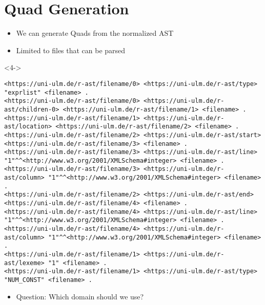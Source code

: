 \documentclass[aspectratio=169,usepdftitle=true,presentation,10pt]{beamer}
\begin{document}
\section[Quad Generation]{Quad Generation}
\begin{frame}[fragile]{\insertsection}
\begin{itemize}
   \item<2-> We can generate Quads from the normalized AST
   \item<3-> Limited to files that can be parsed
\end{itemize}
\bigskip
\begin{uncoverenv}<4->
\soldisablenumhl
\begin{verbatim}
<https://uni-ulm.de/r-ast/filename/0> <https://uni-ulm.de/r-ast/type> "exprlist" <filename> .
<https://uni-ulm.de/r-ast/filename/0> <https://uni-ulm.de/r-ast/children-0> <https://uni-ulm.de/r-ast/filename/1> <filename> .
<https://uni-ulm.de/r-ast/filename/1> <https://uni-ulm.de/r-ast/location> <https://uni-ulm.de/r-ast/filename/2> <filename> .
<https://uni-ulm.de/r-ast/filename/2> <https://uni-ulm.de/r-ast/start> <https://uni-ulm.de/r-ast/filename/3> <filename> .
<https://uni-ulm.de/r-ast/filename/3> <https://uni-ulm.de/r-ast/line> "1"^^<http://www.w3.org/2001/XMLSchema#integer> <filename> .
<https://uni-ulm.de/r-ast/filename/3> <https://uni-ulm.de/r-ast/column> "1"^^<http://www.w3.org/2001/XMLSchema#integer> <filename> .
<https://uni-ulm.de/r-ast/filename/2> <https://uni-ulm.de/r-ast/end> <https://uni-ulm.de/r-ast/filename/4> <filename> .
<https://uni-ulm.de/r-ast/filename/4> <https://uni-ulm.de/r-ast/line> "1"^^<http://www.w3.org/2001/XMLSchema#integer> <filename> .
<https://uni-ulm.de/r-ast/filename/4> <https://uni-ulm.de/r-ast/column> "1"^^<http://www.w3.org/2001/XMLSchema#integer> <filename> .
<https://uni-ulm.de/r-ast/filename/1> <https://uni-ulm.de/r-ast/lexeme> "1" <filename> .
<https://uni-ulm.de/r-ast/filename/1> <https://uni-ulm.de/r-ast/type> "NUM_CONST" <filename> .
\end{verbatim}
\end{uncoverenv}\bigskip
\begin{itemize}
   \item<5-> Question: Which domain should we use?
\end{itemize}
\end{frame}
\end{document}

